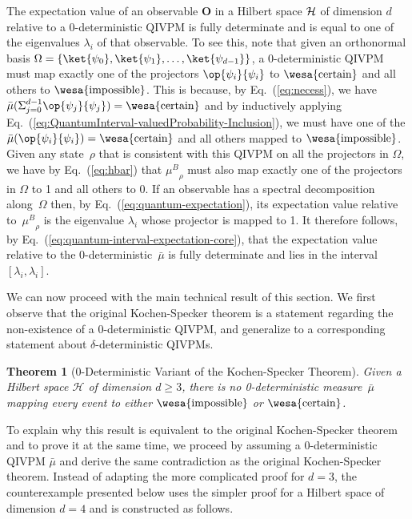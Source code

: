 \documentclass[english,reprint, aps, prl,superscriptaddress, showpacs,
showkeys, longbibliography, amsmath, amssymb, floatfix]{revtex4-1}
\theoremstyle{plain}
\newtheorem{thm}{Theorem}
\theoremstyle{definition}
\newcommand{\Hilb}{\mathcal{H}}
\newcommand{\imposs}{{\text{\wesa{impossible}}}}
\newcommand{\necess}{{\text{\wesa{certain}}}}
\newcommand{\proj}[1]{\op{#1}{#1}}
\newcommand{\muB}{\ensuremath{\mu^{B}}}
\begin{document}
The expectation value of an observable $\mathbf{O}$ in a Hilbert space
${\cal H}$ of dimension $d$ relative to a 0-deterministic QIVPM is
fully determinate and is equal to one of the eigenvalues $\lambda_i$
of that observable. To see this, note that given an orthonormal basis
$\Omega=\{ \ket{\psi_0},\ket{\psi_1},\ldots,\ket{\psi_{d-1}}\}$, a
0-deterministic QIVPM must map exactly one of the projectors
$\proj{\psi_i}$ to $\necess$ and all others to $\imposs$. This is
because, by Eq.~(\ref{eq:necess}), we have
$\bar{\mu}(\Sigma_{j=0}^{d-1}{\proj{\psi_j}})=\necess$ and by
inductively applying
Eq.~(\ref{eq:QuantumInterval-valuedProbability-Inclusion}), we must
have one of the $\bar{\mu}(\proj{\psi_i})=\necess$ and all others
mapped to $\imposs$. Given any state~$\rho$ that is consistent with
this QIVPM on all the projectors in $\Omega$, we have by
Eq.~(\ref{eq:hbar}) that $\muB_{\rho}$ must also map exactly one of
the projectors in $\Omega$ to 1 and all others to 0. If an observable
has a spectral decomposition along~$\Omega$ then, by
Eq.~(\ref{eq:quantum-expectation}), its expectation value relative
to~$\muB_{\rho}$ is the eigenvalue $\lambda_i$ whose projector is
mapped to 1. It therefore follows, by
Eq.~(\ref{eq:quantum-interval-expectation-core}), that the expectation
value relative to the 0-deterministic~${\bar{\mu}}$ is fully
determinate and lies in the interval $[\lambda_i,\lambda_i]$.

We can now proceed with the main technical result of this section. We
first observe that the original Kochen-Specker theorem is a statement
regarding the non-existence of a $0$-deterministic QIVPM, and
generalize to a corresponding statement about $\delta$-deterministic QIVPMs.

\begin{thm}[0-Deterministic Variant of the Kochen-Specker
  Theorem] \label{thm:Kochen-Specker} Given a Hilbert space $\Hilb$ of
  dimension $d\ge3$, there is no 0-deterministic measure~$\bar{\mu}$
  mapping every event to either $\imposs$ or $\necess$.
\end{thm}

\noindent To explain why this result is equivalent to the original
Kochen-Specker theorem and to prove it at the same time, we proceed by
assuming a 0-deterministic QIVPM $\bar{\mu}$ and derive the same
contradiction as the original Kochen-Specker theorem. Instead of
adapting the more complicated proof for $d=3$, the counterexample
presented below uses the simpler proof for a Hilbert space of
dimension $d=4$ and is constructed as follows.
\end{document}
